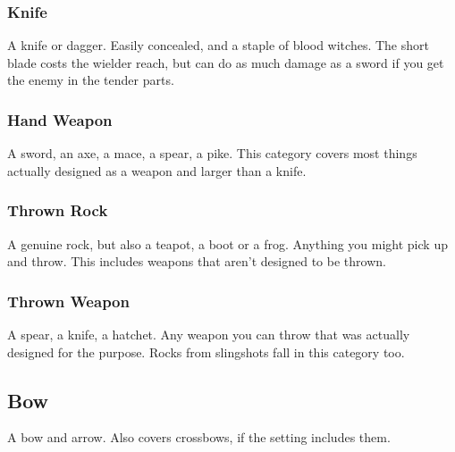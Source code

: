 \subsubsection{Knife}
A knife or dagger.
Easily concealed, and a staple of blood witches.
The short blade costs the wielder reach, but can do as much damage as a sword if you get the enemy in the tender parts.

\subsubsection{Hand Weapon}
A sword, an axe, a mace, a spear, a pike.
This category covers most things actually designed as a weapon and larger than a knife.

\subsubsection{Thrown Rock}
A genuine rock, but also a teapot, a boot or a frog.
Anything you might pick up and throw.
This includes weapons that aren't designed to be thrown.

\subsubsection{Thrown Weapon}
A spear, a knife, a hatchet.
Any weapon you can throw that was actually designed for the purpose.
Rocks from slingshots fall in this category too.

\subsection{Bow}
A bow and arrow.
Also covers crossbows, if the setting includes them.
